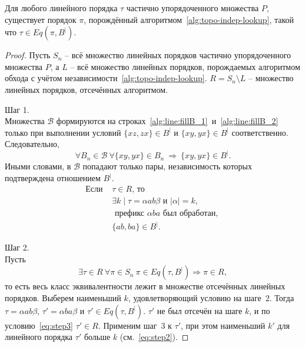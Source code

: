 \begin{theorem}
  Для любого линейного порядка $\tau$ частично упорядоченного
  множества $P$, существует порядок $\pi$, порождённый
  алгоритмом~\ref{alg:topo-indep-lookup}, такой что $\tau \in Eq(\pi, B^|)$.
\end{theorem}
\begin{proof}
  Пусть $S_n$ -- всё множество линейных порядков частично
  упорядоченного множества $P$, а $L$ -- всё множество линейных
  порядков, порождаемых алгоритмом обхода с учётом
  независимости~\ref{alg:topo-indep-lookup}.
  $R = S_n \setminus L$ -- множество линейных порядков, отсечённых алгоритмом.

  \noindent
  Шаг 1.\\
  Множества $\mathcal{B}$ формируются на
  строках~\ref{alg:line:fillB_1}~и~\ref{alg:line:fillB_2} только при
  выполнении условий $\{xz, zx\} \in B^{|}$ и $\{xy, yx\} \in B^{|}$
  соответственно. Следовательно,
  \begin{equation}
    \forall B_n \in \mathcal{B}\ \forall \{xy, yx\} \in B_n
    \ \Rightarrow\ \{xy, yx\} \in B^{|}.
    \label{eq:step1}
  \end{equation}
  Иными словами, в $\mathcal{B}$ попадают только пары, независимость
  которых подтверждена отношением $B^{|}$.
  \begin{equation}
    \begin{aligned}
      \text{Если } &\tau \in R \text{, то } \\
      &\exists k \mid \tau = \alpha ab \beta \text{ и } |\alpha| = k, \\
      &\text{ префикс } \alpha ba \text{ был обработан, } \\
      &\{ab, ba\} \in B^{|}.
    \end{aligned}
    \label{eq:step2}
  \end{equation}

  \noindent
  Шаг 2.\\
  Пусть
  \begin{equation}
    \exists \tau \in R\ \forall \pi \in S_n \
    \pi \in Eq(\tau, B^{|}) \Rightarrow \pi \in R,
    \label{eq:step3}
  \end{equation}
  то есть весь класс эквивалентности лежит в множестве отсечённых
  линейных порядков.
  Выберем наименьший $k$, удовлетворяющий условию на шаге~2.
  Тогда $\tau = \alpha ab \beta$, $\tau' = \alpha ba \beta$ и
  $\tau' \in Eq(\tau, B^{|})$.
  $\tau'$ не был отсечён на шаге $k$, и по условию~\eqref{eq:step3}
  $\tau' \in R$.
  Применим шаг~3 к $\tau'$, при этом наименьший $k'$ для линейного
  порядка $\tau'$ больше $k$ (см.~\eqref{eq:step2}).


\end{proof}
